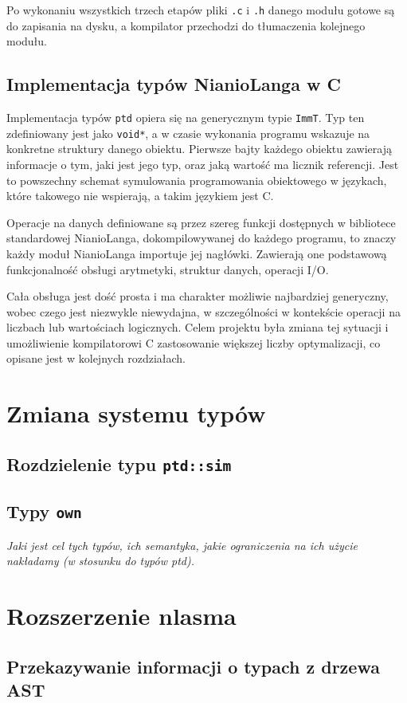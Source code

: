 \documentclass[licencjacka]{pracamgr}
\begin{document}
Po wykonaniu wszystkich trzech etapów pliki \texttt{.c} i \texttt{.h} danego modułu gotowe są do zapisania na dysku, a kompilator przechodzi do tłumaczenia kolejnego modułu.
\section{Implementacja typów NianioLanga w C}
\label{sec:c_types_implementation}
Implementacja typów \texttt{ptd} opiera się na generycznym typie \texttt{ImmT}. Typ ten zdefiniowany jest jako \texttt{void*}, a w czasie wykonania programu wskazuje na konkretne struktury danego obiektu. Pierwsze bajty każdego obiektu zawierają informacje o tym, jaki jest jego typ, oraz jaką wartość ma licznik referencji. Jest to powszechny schemat symulowania programowania obiektowego w językach, które takowego nie wspierają, a takim językiem jest C.


Operacje na danych definiowane są przez szereg funkcji dostępnych w bibliotece standardowej NianioLanga, dokompilowywanej do każdego programu, to znaczy każdy moduł NianioLanga importuje jej nagłówki. Zawierają one podstawową funkcjonalność obsługi arytmetyki, struktur danych, operacji I/O.


Cała obsługa jest dość prosta i ma charakter możliwie najbardziej generyczny, wobec czego jest niezwykle niewydajna, w szczególności w kontekście operacji na liczbach lub wartościach logicznych. Celem projektu była zmiana tej sytuacji i umożliwienie kompilatorowi C zastosowanie większej liczby optymalizacji, co opisane jest w kolejnych rozdziałach.

\chapter{Zmiana systemu typów}
\section{Rozdzielenie typu \texttt{ptd::sim}}
\section{Typy \texttt{own}}
  \emph{Jaki jest cel tych typów, ich semantyka, jakie ograniczenia na ich użycie
    nakładamy (w stosunku do typów ptd).}


\chapter{Rozszerzenie nlasma}
\section{Przekazywanie informacji o typach z drzewa AST}
\end{document}
